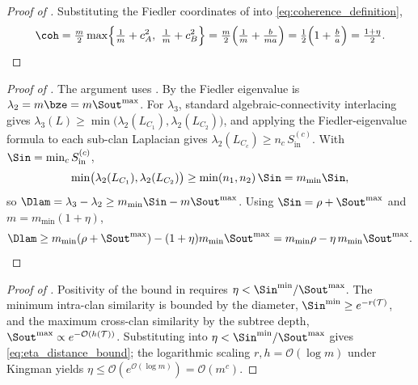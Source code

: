 \begin{proof}[Proof of ]
Substituting the Fiedler coordinates of  into
\eqref{eq:coherence_definition},
\[
   \coh=\tfrac m2\max\Bigl\{\tfrac1m+c_A^2,\ \tfrac1m+c_B^2\Bigr\}
       =\tfrac m2\Bigl(\tfrac1m+\tfrac{b}{ma}\Bigr)
       =\tfrac12\Bigl(1+\tfrac ba\Bigr)=\tfrac{1+\eta}{2}. \qedhere
\]
\end{proof}

\begin{proof}[Proof of ]
The argument uses . By  the
Fiedler eigenvalue is $\lambda_2=m\bze=m\Sout^{\max}$.
For $\lambda_3$, standard algebraic-connectivity interlacing gives
$\lambda_3(L)\ge\min\bigl(\lambda_2(L_{C_1}),\lambda_2(L_{C_2})\bigr)$, and applying
the Fiedler-eigenvalue formula to each sub-clan Laplacian gives
$\lambda_2(L_{C_c})\ge n_c\,S_{\mathrm{in}}^{(c)}$. With
$\Sin=\min_c S_{\mathrm{in}}^{(c)}$,
\[
   \min\bigl(\lambda_2(L_{C_1}),\lambda_2(L_{C_2})\bigr)\ge\min(n_1,n_2)\,\Sin=m_{\min}\Sin,
\]
so $\Dlam=\lambda_3-\lambda_2\ge m_{\min}\Sin-m\Sout^{\max}$. Using
$\Sin=\rho+\Sout^{\max}$ and $m=m_{\min}(1+\eta)$,
\[
   \Dlam\ge m_{\min}(\rho+\Sout^{\max})-(1+\eta)m_{\min}\Sout^{\max}
        =m_{\min}\rho-\eta\,m_{\min}\Sout^{\max}. \qedhere
\]
\end{proof}

\begin{proof}[Proof of ]
Positivity of the bound in  requires
$\eta<\Sin^{\min}/\Sout^{\max}$. The minimum intra-clan similarity is bounded by
the diameter, $\Sin^{\min}\ge e^{-r(\mathcal T)}$, and the maximum cross-clan
similarity by the subtree depth, $\Sout^{\max}\propto e^{-\mathcal O(h(\mathcal T))}$.
Substituting into $\eta<\Sin^{\min}/\Sout^{\max}$ gives \eqref{eq:eta_distance_bound};
the logarithmic scaling $r,h=\mathcal O(\log m)$ under Kingman yields
$\eta\le\mathcal O(e^{\mathcal O(\log m)})=\mathcal O(m^c)$.
\end{proof}
